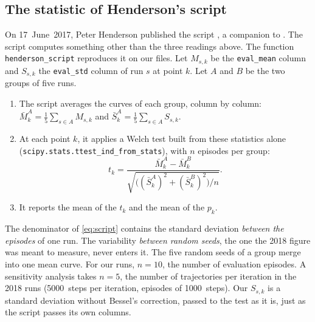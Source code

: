 \subsection{The statistic of Henderson's script}\label{sec:script-henderson}
On 17~June~2017, Peter Henderson published the script 
\parencite{henderson2017samedist}, a companion to \textcite{islam2017reproducibility}. The script computes
something other than the three readings above. The function \texttt{henderson\_script} reproduces it on our
files. Let $M_{s,k}$ be the \texttt{eval\_mean} column and $S_{s,k}$ the \texttt{eval\_std} column of run $s$
at point $k$. Let $A$ and $B$ be the two groups of five runs.
\begin{enumerate}
  \item The script averages the curves of each group, column by column:
    $\bar M^A_k=\frac15\sum_{s\in A}M_{s,k}$ and $\bar S^A_k=\frac15\sum_{s\in A}S_{s,k}$.
  \item At each point $k$, it applies a Welch test built from these statistics alone
    (\texttt{scipy.stats.ttest\_ind\_from\_stats}), with $n$ episodes per group:
    \begin{equation}\label{eq:script}
      t_k=\frac{\bar M^A_k-\bar M^B_k}{\sqrt{\bigl((\bar S^A_k)^2+(\bar S^B_k)^2\bigr)/n}} .
    \end{equation}
  \item It reports the mean of the $t_k$ and the mean of the $p_k$.
\end{enumerate}
The denominator of \cref{eq:script} contains the standard deviation \emph{between the episodes} of one run. The
variability \emph{between random seeds}, the one the 2018 figure was meant to measure, never enters it. The
five random seeds of a group merge into one mean curve. For our runs, $n=10$, the number of evaluation
episodes. A sensitivity analysis takes $n=5$, the number of trajectories per iteration in the 2018 runs
(\num{5000}~steps per iteration, episodes of \num{1000}~steps). Our $S_{s,k}$ is a standard deviation without
Bessel's correction, passed to the test as it is, just as the script passes its own columns.

